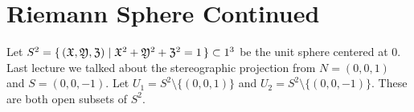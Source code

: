 \setcounter{section}{0}
\setcounter{theorem}{0}


\section{Riemann Sphere Continued}

Let $S^2 = \set{ (\mathfrak{X}, \mathfrak{Y}, \mathfrak{Z}) \mid \mathfrak{X}^2 + \mathfrak{Y}^2 +\mathfrak{Z}^2  =1 } \subset 1^3$ be the unit sphere centered at $0$. Last lecture we talked about the stereographic projection from $N = (0,0,1)$ and $S = (0,0,-1)$. Let $U_1 = S^2 \setminus \{ (0,0,1) \}$ and $U_2 = S^2 \setminus \{ (0,0,-1) \}$. These are both open subsets of $S^2$.



